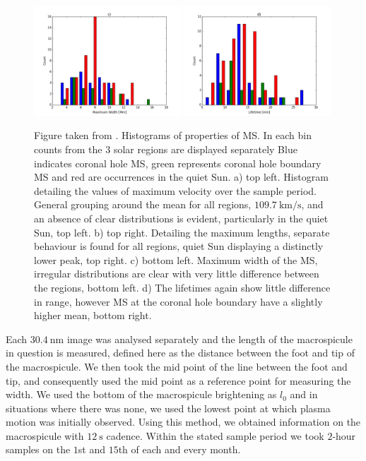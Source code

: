 \begin{figure}[t!]
	\includegraphics[width=0.49\textwidth, height=0.24\textheight]{Chapter3/Figs/width_hist.pdf}
	\includegraphics[width=0.49\textwidth, height=0.24\textheight]{Chapter3/Figs/lt_hist.pdf}	
	\caption{\small Figure taken from \cite{Bennett2015}. Histograms of properties of MS. In each bin counts from the 3 solar regions are displayed separately Blue indicates coronal hole MS, green represents coronal hole boundary MS and red are occurrences in the quiet Sun. a) top left. Histogram detailing the values of maximum velocity over the sample period. General grouping around the mean for all regions, $109.7\ \textrm{km/s}$, and an absence of clear distributions is evident, particularly in the quiet Sun, top left. b) top right. Detailing the maximum lengths, separate behaviour is found for all regions, quiet Sun displaying a distinctly lower peak, top right. c) bottom left. Maximum width of the MS, irregular distributions are clear with very little difference between the regions, bottom left. d) The lifetimes again show little difference in range, however MS at the coronal hole boundary have a slightly higher mean, bottom right.}
	\label{fig:basic-prop}
\end{figure}


Each $30.4\ \textrm{nm}$ image was analysed separately and the length of the macrospicule in question is measured, defined here as the distance between the foot and tip of the macrospicule. We then took the mid point of the line between the foot and tip, and consequently used the mid point as a reference point for measuring the width. We used the bottom of the macrospicule brightening as $l_0$ and in situations where there was none, we used the lowest point at which plasma motion was initially observed. Using this method, we obtained information on the macrospicule with $12\ \textrm{s}$ cadence. Within the stated sample period we took $2$-hour samples on the $1$st and $15$th of each and every month.

